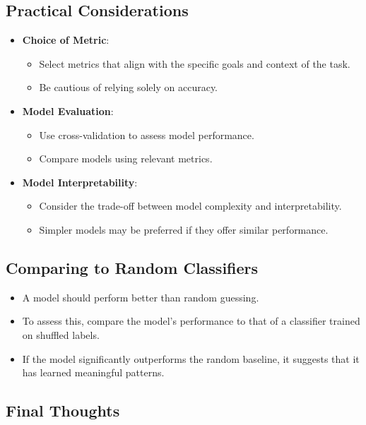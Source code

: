 \documentclass{article}
\begin{document}
\subsection{Practical Considerations}

\begin{itemize}
    \item \textbf{Choice of Metric}:
    \begin{itemize}
        \item Select metrics that align with the specific goals and context of the task.
        \item Be cautious of relying solely on accuracy.
    \end{itemize}
    \item \textbf{Model Evaluation}:
    \begin{itemize}
        \item Use cross-validation to assess model performance.
        \item Compare models using relevant metrics.
    \end{itemize}
    \item \textbf{Model Interpretability}:
    \begin{itemize}
        \item Consider the trade-off between model complexity and interpretability.
        \item Simpler models may be preferred if they offer similar performance.
    \end{itemize}
\end{itemize}

\subsection{Comparing to Random Classifiers}

\begin{itemize}
    \item A model should perform better than random guessing.
    \item To assess this, compare the model's performance to that of a classifier trained on shuffled labels.
    \item If the model significantly outperforms the random baseline, it suggests that it has learned meaningful patterns.
\end{itemize}

\subsection{Final Thoughts}
\end{document}
